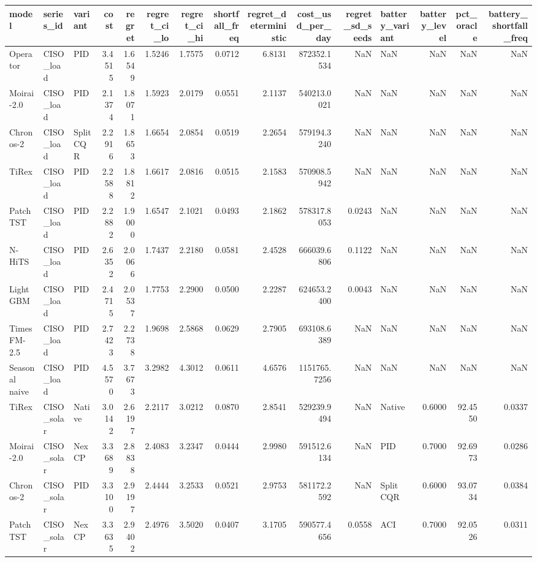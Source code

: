 \begin{tabular}{lllrrrrrrrrlrrr}
\toprule
model & series_id & variant & cost & regret & regret_ci_lo & regret_ci_hi & shortfall_freq & regret_deterministic & cost_usd_per_day & regret_sd_seeds & battery_variant & battery_level & pct_oracle & battery_shortfall_freq \\
\midrule
Operator & CISO_load & PID & 3.4515 & 1.6549 & 1.5246 & 1.7575 & 0.0712 & 6.8131 & 872352.1534 & NaN & NaN & NaN & NaN & NaN \\
Moirai-2.0 & CISO_load & PID & 2.1374 & 1.8071 & 1.5923 & 2.0179 & 0.0551 & 2.1137 & 540213.0021 & NaN & NaN & NaN & NaN & NaN \\
Chronos-2 & CISO_load & Split CQR & 2.2916 & 1.8653 & 1.6654 & 2.0854 & 0.0519 & 2.2654 & 579194.3240 & NaN & NaN & NaN & NaN & NaN \\
TiRex & CISO_load & PID & 2.2588 & 1.8812 & 1.6617 & 2.0816 & 0.0515 & 2.1583 & 570908.5942 & NaN & NaN & NaN & NaN & NaN \\
PatchTST & CISO_load & PID & 2.2882 & 1.9000 & 1.6547 & 2.1021 & 0.0493 & 2.1862 & 578317.8053 & 0.0243 & NaN & NaN & NaN & NaN \\
N-HiTS & CISO_load & PID & 2.6352 & 2.0066 & 1.7437 & 2.2180 & 0.0581 & 2.4528 & 666039.6806 & 0.1122 & NaN & NaN & NaN & NaN \\
LightGBM & CISO_load & PID & 2.4715 & 2.0537 & 1.7753 & 2.2900 & 0.0500 & 2.2287 & 624653.2400 & 0.0043 & NaN & NaN & NaN & NaN \\
TimesFM-2.5 & CISO_load & PID & 2.7423 & 2.2738 & 1.9698 & 2.5868 & 0.0629 & 2.7905 & 693108.6389 & NaN & NaN & NaN & NaN & NaN \\
Seasonal naive & CISO_load & PID & 4.5570 & 3.7673 & 3.2982 & 4.3012 & 0.0611 & 4.6576 & 1151765.7256 & NaN & NaN & NaN & NaN & NaN \\
TiRex & CISO_solar & Native & 3.0142 & 2.6197 & 2.2117 & 3.0212 & 0.0870 & 2.8541 & 529239.9494 & NaN & Native & 0.6000 & 92.4550 & 0.0337 \\
Moirai-2.0 & CISO_solar & NexCP & 3.3689 & 2.8838 & 2.4083 & 3.2347 & 0.0444 & 2.9980 & 591512.6134 & NaN & PID & 0.7000 & 92.6973 & 0.0286 \\
Chronos-2 & CISO_solar & PID & 3.3100 & 2.9197 & 2.4444 & 3.2533 & 0.0521 & 2.9753 & 581172.2592 & NaN & Split CQR & 0.6000 & 93.0734 & 0.0384 \\
PatchTST & CISO_solar & NexCP & 3.3635 & 2.9402 & 2.4976 & 3.5020 & 0.0407 & 3.1705 & 590577.4656 & 0.0558 & ACI & 0.7000 & 92.0526 & 0.0311 \\

\end{tabular}

